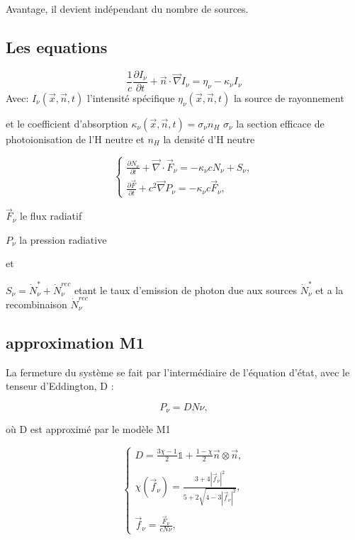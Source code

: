 Avantage, il devient indépendant du nombre de sources.


\subsection{Les equations}
\begin{equation}
\frac{1}{c} \frac{\partial I_\nu}{\partial t} + \vec{n}\cdot \vec{\nabla} I_\nu = \eta_\nu - \kappa_\nu I_\nu 
\end{equation}
Avec: $I_\nu(\vec{x},\vec{n},t)$ l'intensité spécifique
$\eta_\nu(\vec{x},\vec{n},t)$ la source de rayonnement

et le coefficient d'absorption $\kappa_\nu(\vec{x},\vec{n},t) = \sigma_\nu n_H$ 
$\sigma_\nu$ la section efficace de photoionisation de l'H neutre et $n_H$ la densité d'H neutre


\begin{equation}
\begin{cases}

\frac{ \partial N_\nu }{ \partial t } + \vec{\nabla} \cdot \vec{F}_\nu = -\kappa_\nu c  N_\nu + S_\nu,\\

\frac{ \partial \vec{F} }{ \partial t } + c^2 \vec{\nabla} P_\nu = -\kappa_\nu c \vec{F}_\nu ,

\end{cases}
\label{eq:densite_energie}
\end{equation}

$\vec{F}_\nu$ le flux radiatif

$P_\nu $ la pression radiative

et 

$S_\nu = \dot{N}_\nu^* + \dot{N}_\nu^{rec}$ etant le taux d'emission de photon due aux sources $\dot{N}_\nu^*$ et a la recombinaison $ \dot{N}_\nu^{rec}$


\subsection{approximation M1}
La fermeture du système se fait par l’intermédiaire de l’équation
d’état, avec le tenseur d’Eddington, D :

\begin{equation}
 P_\nu = D N\nu ,
\label{eq:fermeture}
\end{equation}

où D est approximé par le modèle M1 \citep{levermore1984}%

\begin{equation}
\begin{cases}

D = \frac{ 3\chi -1 }{2} \mathbb{1} + \frac{ 1 - \chi }{2} \vec{n} \otimes \vec{n} , \\
\\
\chi(\vec{f}_\nu) = \frac{ 3+4 |\vec{f}_\nu|^2 }{5+2\sqrt{4-3|\vec{f}_\nu|^2}} , \\
\\
\vec{f}_\nu = \frac{ \vec{F}_\nu }{c N\nu }  ,

\end{cases}
\label{eq:tenseur}
\end{equation}





